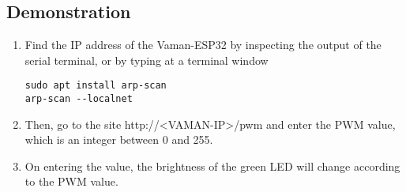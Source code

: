 \subsection{Demonstration}
\begin{enumerate}
    \item Find the IP address of the Vaman-ESP32 by inspecting the output of the
    serial terminal, or by typing at a terminal window
    \begin{lstlisting}
sudo apt install arp-scan
arp-scan --localnet
    \end{lstlisting}
    \item Then, go to the site http://<VAMAN-IP>/pwm and enter the PWM value,
    which is an integer between 0 and 255.
    \item On entering the value, the brightness of the green LED will change 
    according to the PWM value.
\end{enumerate}